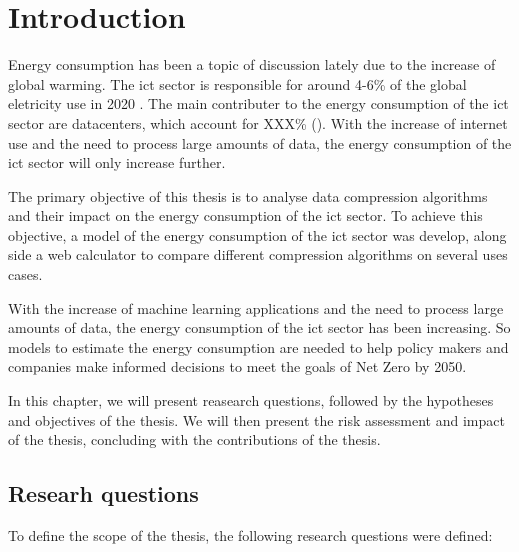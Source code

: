 

\chapter{Introduction}
\label{chapter:introduction}

\begin{introduction}

Energy consumption has been a topic of discussion lately due to the increase of global warming. The \ac{ict} sector is responsible for around 4-6\% of the global eletricity use in 2020 \citet{UK-parliament}. The main contributer to the energy consumption of the \ac{ict} sector are datacenters, which account for XXX\% (\citet{check source}). With the increase of internet use and the need to process large amounts of data, the energy consumption of the \ac{ict} sector will only increase further.

The primary objective of this thesis is to analyse data compression algorithms and their impact on the energy consumption of the \ac{ict} sector.
To achieve this objective, a model of the energy consumption of the \ac{ict} sector was develop, along side a web calculator to compare different compression algorithms on several uses cases. 

With the increase of machine learning applications and the need to process large amounts of data, the energy consumption of the \ac{ict} sector has been increasing. So models to estimate the energy consumption are needed to help policy makers and companies make informed decisions to meet the goals of Net Zero by 2050.

In this chapter, we will present reasearch questions, followed by the hypotheses and objectives of the thesis. We will then present the risk assessment and impact of the thesis, concluding with the contributions of the thesis. 

\end{introduction}

\section{Researh questions}
\label{section:research_questions}

To define the scope of the thesis, the following research questions were defined:

